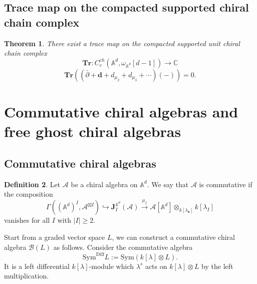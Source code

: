 \documentclass[11pt]{amsart}
\newtheorem{thm}{Theorem}[section]
\theoremstyle{definition}
\newtheorem{defn}[thm]{Definition}
\theoremstyle{remark}
\numberwithin{equation}{section}
\begin{document}
\subsection{Trace map on the compacted supported chiral chain complex}

\begin{thm}
    There exist a trace map on the compacted supported unit chiral chain complex
    $$
    \mathbf{Tr}:C^{ch}_c(\mathbb{A}^d,\omega_{\mathbb{A}^d}[d-1])\rightarrow\mathbb{C}
    $$
    $$
    \mathbf{Tr}\left((\bar{\partial}+\mathbf{d}+d_{\mu_2}+d_{\mu_3}+\cdots)(-)\right)=0.
    $$
\end{thm}

\fi
\section{Commutative chiral algebras and free ghost chiral algebras}
\subsection{Commutative chiral algebras}
\begin{defn}
   Let $\mathcal{A}$ be a chiral algebra on $\mathbb{A}^d$. We say that $\mathcal{A}$ is commutative if the composition
$$
\Gamma\left((\mathbb{A}^d)^{ I},\mathcal{A}^{\boxtimes  I}\right)\hookrightarrow \mathbf{J}_{ I}^{\mathbb{A}^d}(\mathcal{A})\xrightarrow{\mu_{ I}}\mathcal{A}[\mathbb{A}^d]\otimes_{k[\lambda_{\bullet}]}k[\lambda_I]
$$
    vanishes for all $I$ with $|I|\geq 2$.
\end{defn}


Start from a graded vector space $L$, we can construct a commutative chiral algebra $\mathcal{B}(L)$ as follows. Consider the commutative algebra
$$
\mathrm{Sym}^{\mathrm{Diff}}L:=\mathrm{Sym}(k[\lambda]\otimes L).
$$
It is a left differential $k[\lambda]$-module which $\lambda^s$ acts on $k[\lambda]\otimes L$ by the left multiplication.
\end{document}
